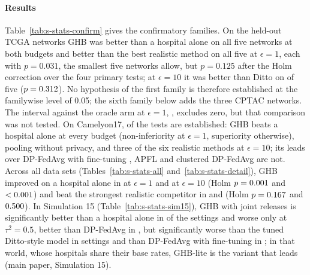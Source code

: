 \documentclass[acmsmall,screen,nonacm]{acmart}
\theoremstyle{acmdefinition}
\begin{document}
\paragraph{Results} Table~\ref{tab:s-stats-confirm} gives the confirmatory families. On the held-out TCGA networks GHB was better than a hospital alone on all five networks at both budgets and better than the best realistic method on all five at $\epsilon=1$, each with $p=0.031$, the smallest five networks allow, but $p=0.125$ after the Holm correction over the four primary tests; at $\epsilon=10$ it was better than Ditto \cite{li2021ditto} on \SimStTTenRealWins{} of five ($p=0.312$). No hypothesis of the first family is therefore established at the familywise level of 0.05; the sixth family below adds the three CPTAC networks. The interval against the oracle arm at $\epsilon=1$, \SimStTOneOrcCI, excludes zero, but that comparison was not tested. On Camelyon17, \SimStCamEstablished{} of the \SimStCamTests{} tests are established: GHB beats a hospital alone at every budget (non-inferiority at $\epsilon=1$, superiority otherwise), pooling without privacy, and three of the six realistic methods at $\epsilon=10$; its leads over DP-FedAvg with fine-tuning \cite{mcmahan2018learning}, APFL \cite{deng2020adaptive} and clustered DP-FedAvg \cite{ghosh2020efficient,mcmahan2018learning} are not. Across all \SimStAllN{} data sets (Tables~\ref{tab:s-stats-all} and~\ref{tab:s-stats-detail}), GHB improved on a hospital alone in \SimStAllOneLocWins{} at $\epsilon=1$ and \SimStAllTenLocWins{} at $\epsilon=10$ (Holm $p=0.001$ and $<0.001$) and beat the strongest realistic competitor in \SimStAllOneRealWins{} and \SimStAllTenRealWins{} (Holm $p=0.167$ and $0.500$). In Simulation 15 (Table~\ref{tab:s-stats-sim15}), GHB with joint releases is significantly better than a hospital alone in \SimStSimLocBetter{} of the \SimStSimLocN{} settings and worse only at $\tau^2=0.5$, better than DP-FedAvg \cite{mcmahan2018learning} in \SimStSimAvgBetter, but significantly worse than the tuned Ditto-style model \cite{li2021ditto} in \SimStSimDittoWorse{} settings and than DP-FedAvg with fine-tuning in \SimStSimFTWorse{}; in that world, whose hospitals share their base rates, GHB-lite is the variant that leads (main paper, Simulation 15).
\end{document}
